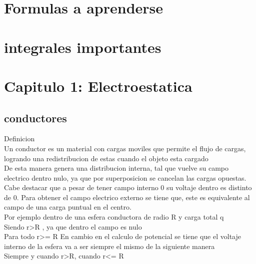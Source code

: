 \section{Formulas a aprenderse}
\section{integrales importantes}
\newpage
\section{Capitulo 1: Electroestatica}
\subsection{conductores}
Definicion\\
Un conductor es un material con cargas moviles que permite el flujo de cargas, logrando una redistribucion de estas cuando el objeto esta cargado\\ 
De esta manera genera una distribucion interna, tal que vuelve su campo electrico dentro nulo, ya que por superposicion se cancelan las cargas opuestas.\\
Cabe destacar que a pesar de tener campo interno 0 su voltaje dentro es distinto de 0.
Para obtener el campo electrico externo se tiene que, este es equivalente al campo de una carga puntual en el centro.\\
Por ejemplo dentro de una esfera conductora de radio R y carga total q\\
Siendo r>R , ya que dentro el campo es nulo
\\ Para todo r>= R
En cambio en el calculo de potencial se tiene que el voltaje interno de la esfera va a ser siempre el mismo de la siguiente manera
 \\ Siempre y cuando r>R, cuando r<= R
